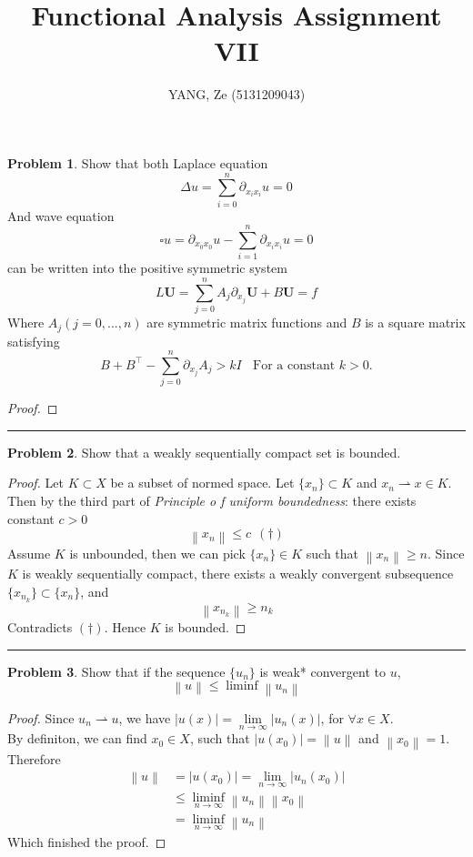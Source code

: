 \documentclass[a4paper, 10pt]{article}
\title{\textbf{Functional Analysis Assignment VII}}
\author{YANG, Ze (5131209043)}
\theoremstyle{definition}
\newtheorem{problem}{Problem}
\theoremstyle{hSol}
\begin{document}
\maketitle

\begin{problem} Show that both Laplace equation
$$
\Delta u = \sum_{i=0}^n \partial_{x_i x_i} u = 0
$$
And wave equation
$$
\square u = \partial_{x_0 x_0} u - \sum_{i=1}^n \partial_{x_i x_i} u = 0
$$
can be written into the positive symmetric system
$$
L \bm{U} = \sum_{j=0}^n A_j \partial_{x_j}\bm{U} + B \bm{U} = f
$$
Where $A_j(j=0,...,n)$ are symmetric matrix functions and $B$ is a square matrix satisfying
$$
B + B^{\top} - \sum_{j=0}^n \partial_{x_j}A_j > kI~~~~\text{For a constant $k>0$.}
$$
\end{problem}
\begin{proof} 
\end{proof}

\noindent\rule{16cm}{0.4pt}
\begin{problem} Show that a weakly sequentially compact set is bounded. 
\end{problem}
\begin{proof} Let $K\subset X$ be a subset of normed space. Let $\{x_n\}\subset K$ and $x_n \rightharpoonup x\in K$. Then by the third part of \textit{Principle o f uniform boundedness}: there exists constant $c>0$
$$
\left\|x_n\right\| \leq c~~(\dag)
$$
Assume $K$ is unbounded, then we can pick $\{x_n\}\in K$ such that $\left\|x_n\right\|\geq n$. Since $K$ is weakly sequentially compact, there exists a weakly convergent subsequence $\{x_{n_k}\}\subset \{x_n\}$, and 
$$
\left\|x_{n_k}\right\| \geq n_k
$$
Contradicts $(\dag)$. Hence $K$ is bounded.
\end{proof}

\noindent\rule{16cm}{0.4pt}
\begin{problem} Show that if the sequence $\{u_n\}$ is weak* convergent to $u$,
$$
\left\|u\right\| \leq \liminf\limits_{} \left\|u_n\right\|
$$
\end{problem}
\begin{proof} Since $u_n \rightharpoonup u$, we have $|u(x)|=\lim\limits_{n\rightarrow\infty}|u_n(x)|$, for $\forall x\in X$. \\
By definiton, we can find $x_0 \in X$, such that $|u(x_0)|=\left\|u\right\|$ and $\left\|x_0\right\|=1$. Therefore
\begin{equation}
	\begin{split}
		\left\|u\right\| &= |u(x_0)| = \lim\limits_{n\rightarrow\infty}|u_n(x_0)| \\
		& \leq \liminf\limits_{n\rightarrow\infty} \left\|u_n\right\| \left\|x_0\right\| \\
		& =\liminf\limits_{n\rightarrow\infty} \left\|u_n\right\|
	\end{split}
\end{equation}
Which finished the proof.
\end{proof}
\end{document}
